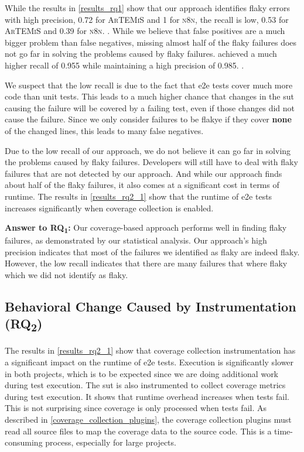 While the results in \cref{results_rq1} show that our approach identifies flaky errors with high precision, \num{0.72} for \textsc{ArTEMiS} and \num{1} for \textsc{n8n}, the recall is low, \num{0.53} for \textsc{ArTEMiS} and \num{0.39} for \textsc{n8n}. .
While we believe that false positives are a much bigger problem than false negatives, missing almost half of the flaky failures does not go far in solving the problems caused by flaky failures.
 achieved a much higher recall of \num{0.955} while maintaining a high precision of \num{0.985}. \cite{bell_deflaker_2018}.

We suspect that the low recall is due to the fact that \ac{e2e} tests cover much more code than unit tests.
This leads to a much higher chance that changes in the \ac{sut} causing the failure will be covered by a failing test, even if those changes did not cause the failure.
Since we only consider failures to be flakye if they cover \textbf{none} of the changed lines, this leads to many false negatives.

Due to the low recall of our approach, we do not believe it can go far in solving the problems caused by flaky failures.
Developers will still have to deal with flaky failures that are not detected by our approach.
And while our approach finds about half of the flaky failures, it also comes at a significant cost in terms of runtime.
The results in \cref{results_rq2_1} show that the runtime of \ac{e2e} tests increases significantly when coverage collection is enabled.

\begin{mdframed}
	\textbf{Answer to RQ\textsubscript{1}:} Our coverage-based approach performs well in finding flaky failures, as demonstrated by our statistical analysis.
	Our approach's high precision indicates that most of the failures we identified as flaky are indeed flaky.
	However, the low recall indicates that there are many failures that where flaky which we did not identify as flaky.
\end{mdframed}

\subsection{Behavioral Change Caused by Instrumentation (\texorpdfstring{RQ\textsubscript{2}}{RQ2})}

The results in \cref{results_rq2_1} show that coverage collection instrumentation has a significant impact on the runtime of \ac{e2e} tests.
Execution is significantly slower in both projects, which is to be expected since we are doing additional work during test execution.
The \ac{sut} is also instrumented to collect coverage metrics during test execution.
It shows that runtime overhead increases when tests fail.
This is not surprising since coverage is only processed when tests fail.
As described in \cref{coverage_collection_plugins}, the coverage collection plugins must read all source files to map the coverage data to the source code.
This is a time-consuming process, especially for large projects.

